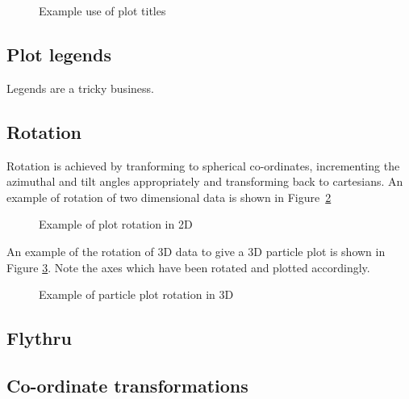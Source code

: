 \documentclass[a4paper,12pt]{article}
\begin{document}
\begin{figure}
\centering

\caption{Example use of plot titles}
\label{fig:titleexample}
\end{figure}

\subsection{Plot legends}
\label{sec:legend}
 Legends are a tricky business.


\subsection{Rotation}
 Rotation is achieved by tranforming to spherical co-ordinates, incrementing the
azimuthal and tilt angles appropriately and transforming back to cartesians.
An example of rotation of two dimensional data is shown in
Figure~\ref{fig:examplerot2D} 
\begin{figure}
\centering

\caption{Example of plot rotation in 2D}
\label{fig:examplerot2D}
\end{figure}

An example of the rotation of 3D data to give a 3D particle plot is shown in
Figure \ref{fig:examplepartrot3D}. Note the axes which have been rotated and
plotted accordingly. 
\begin{figure}
\centering

\caption{Example of particle plot rotation in 3D}
\label{fig:examplepartrot3D}
\end{figure}

\subsection{Flythru}

\subsection{Co-ordinate transformations}
\end{document}
